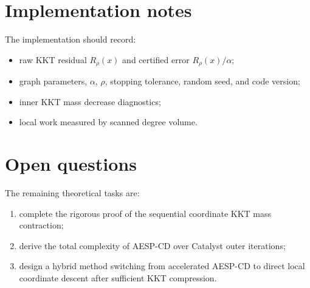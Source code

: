 \documentclass[11pt]{article}
\begin{document}
\section{Implementation notes}

The implementation should record:
\begin{itemize}
\item raw KKT residual $R_\rho(x)$ and certified error $R_\rho(x)/\alpha$;
\item graph parameters, $\alpha$, $\rho$, stopping tolerance, random seed, and code version;
\item inner KKT mass decrease diagnostics;
\item local work measured by scanned degree volume.
\end{itemize}

\section{Open questions}

The remaining theoretical tasks are:
\begin{enumerate}
\item complete the rigorous proof of the sequential coordinate KKT mass contraction;
\item derive the total complexity of AESP-CD over Catalyst outer iterations;
\item design a hybrid method switching from accelerated AESP-CD to direct local coordinate descent after sufficient KKT compression.
\end{enumerate}
\end{document}
